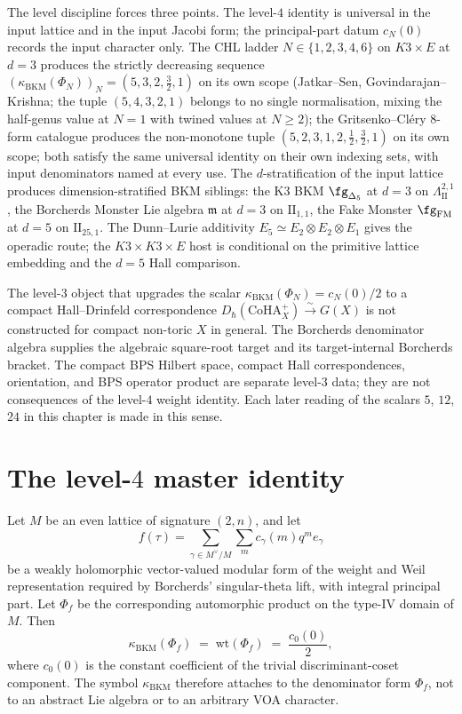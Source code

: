 The level discipline forces three points.  The level-$4$ identity
is universal in the input lattice and in the input Jacobi form; the
principal-part datum $c_N(0)$ records the input character only.  The
CHL ladder $N \in \{1, 2, 3, 4, 6\}$ on $K3 \times E$ at $d = 3$
produces the strictly decreasing sequence
$(\kappa_{\mathrm{BKM}}(\Phi_N))_N = (5, 3, 2, \tfrac32, 1)$ on its own
scope (Jatkar--Sen, Govindarajan--Krishna; the tuple
$(5, 4, 3, 2, 1)$ belongs to no single normalisation, mixing the
half-genus value at $N = 1$ with twined values at
$N \geq 2$); the Gritsenko--Cl\'ery $8$-form
catalogue produces the
non-monotone tuple $(5, 2, 3, 1, 2, \tfrac12, \tfrac32, 1)$ on its
own scope; both satisfy the same universal identity on their own
indexing sets, with input denominators named at every use.  The
$d$-stratification of the input lattice produces dimension-stratified
BKM siblings: the K3 BKM $\fg_{\Delta_5}$ at $d = 3$ on
$\Lambda^{2, 1}_{\mathrm{II}}$, the Borcherds Monster Lie algebra
$\mathfrak{m}$ at $d = 3$ on $\mathrm{II}_{1, 1}$, the Fake Monster
\(\fg_{\mathrm{FM}}\) at \(d=5\) on \(\mathrm{II}_{25,1}\). The
Dunn--Lurie additivity \(E_5\simeq E_2\otimes E_2\otimes E_1\) gives
the operadic route; the \(K3\times K3\times E\) host is conditional on
the primitive lattice embedding and the \(d=5\) Hall comparison.

The level-$3$ object that upgrades the scalar
$\kappa_{\mathrm{BKM}}(\Phi_N) = c_N(0)/2$ to a compact
Hall--Drinfeld correspondence
$D_\hbar(\mathrm{CoHA}^+_{X}) \xrightarrow{\;\sim\;} G(X)$
is not constructed for compact non-toric \(X\) in general.  The
Borcherds denominator algebra supplies the algebraic square-root target
and its target-internal Borcherds bracket.  The compact BPS Hilbert
space, compact Hall correspondences, orientation, and BPS operator
product are separate level-$3$ data; they are not consequences of the
level-$4$ weight identity.  Each later reading of the scalars
$5$, $12$, $24$ in this chapter is made in this sense.

\section{The level-$4$ master identity}
\label{sec:terminus-master-identity}

\begin{theorem}
\label{thm:terminus-universal-borcherds-weight}
Let \(M\) be an even lattice of signature \((2,n)\), and let
\[
 f(\tau)=\sum_{\gamma\in M^\vee/M}\sum_m c_\gamma(m)q^m e_\gamma
\]
be a weakly holomorphic vector-valued modular form of the weight and
Weil representation required by Borcherds' singular-theta lift, with
integral principal part.  Let \(\Phi_f\) be the corresponding
automorphic product on the type-IV domain of \(M\).  Then
\[
 \kappa_{\mathrm{BKM}}(\Phi_f) \;=\; \mathrm{wt}(\Phi_f)
 \;=\; \frac{c_0(0)}{2},
\]
where \(c_0(0)\) is the constant coefficient of the trivial
discriminant-coset component.  The symbol \(\kappa_{\mathrm{BKM}}\)
therefore attaches to the denominator form \(\Phi_f\), not to an
abstract Lie algebra or to an arbitrary VOA character.
\end{theorem}

